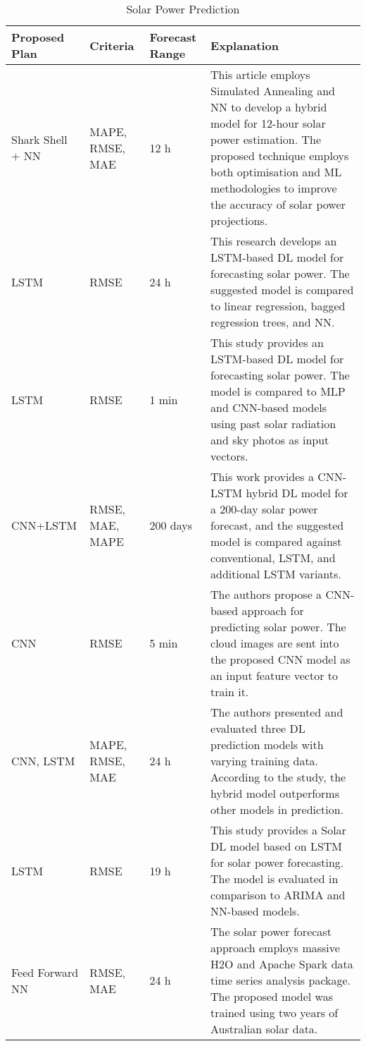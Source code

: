 \begin{longtable}[c]{|p{}|p{}|p{}|p{}|}
\caption{Solar Power Prediction}
\label{tab:my-table}\\
\hline
\textbf{Proposed Plan} & \textbf{Criteria} & \textbf{Forecast Range} & \textbf{Explanation} \\
\hline
\endhead
Shark Shell + NN\cite{lee2018forecasting} & MAPE, RMSE, MAE & 12 h & This article employs Simulated Annealing and NN to develop a hybrid model for 12-hour solar power estimation. The proposed technique employs both optimisation and ML methodologies to improve the accuracy of solar power projections. \\ \hline
LSTM\cite{abedinia2018solar} & RMSE & 24 h & This research develops an LSTM-based DL model for forecasting solar power. The suggested model is compared to linear regression, bagged regression trees, and NN. \\ \hline
LSTM\cite{abedinia2018solar}& RMSE & 1 min &This study provides an LSTM-based DL model for forecasting solar power. The model is compared to MLP and CNN-based models using past solar radiation and sky photos as input vectors. \\ \hline
CNN+LSTM\cite{lee2018forecasting} & RMSE, MAE, MAPE & 200 days &This work provides a CNN-LSTM hybrid DL model for a 200-day solar power forecast, and the suggested model is compared against conventional, LSTM, and additional LSTM variants. \\
CNN\cite{zhang2018deep} & RMSE & 5 min & The authors propose a CNN-based approach for predicting solar power. The cloud images are sent into the proposed CNN model as an input feature vector to train it. \\ \hline
CNN, LSTM\cite{wang2019comparison} & MAPE, RMSE, MAE & 24 h & The authors presented and evaluated three DL prediction models with varying training data. According to the study, the hybrid model outperforms other models in prediction. \\ \hline
LSTM\cite{lee2019deep} & RMSE & 19 h & This study provides a Solar DL model based on LSTM for solar power forecasting. The model is evaluated in comparison to ARIMA and NN-based models. \\
Feed Forward NN\cite{torres2019big} & RMSE, MAE & 24 h & The solar power forecast approach employs massive H2O and Apache Spark data time series analysis package. The proposed model was trained using two years of Australian solar data. \\ \hline

\end{longtable}
